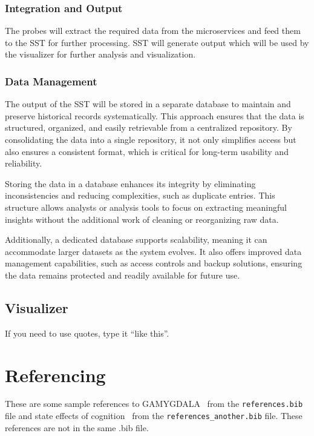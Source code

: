 \subsubsection{Integration and Output}

The probes will extract the required data from the microservices and feed them to the SST for further processing. SST will generate output which will be used by the visualizer for further analysis and visualization.

\subsubsection{Data Management}

The output of the SST will be stored in a separate database to maintain and preserve historical records systematically. This approach ensures that the data is structured, organized, and easily retrievable from a centralized repository. By consolidating the data into a single repository, it not only simplifies access but also ensures a consistent format, which is critical for long-term usability and reliability. 

Storing the data in a database enhances its integrity by eliminating inconsistencies and reducing complexities, such as duplicate entries. This structure allows analysts or analysis tools to focus on extracting meaningful insights without the additional work of cleaning or reorganizing raw data.

Additionally, a dedicated database supports scalability, meaning it can accommodate larger datasets as the system evolves. It also offers improved data management capabilities, such as access controls and backup solutions, ensuring the data remains protected and readily available for future use.

\subsection{Visualizer}\label{subsec:component-visualizer}

If you need to use quotes, type it ``like this''.

\section{Referencing}
These are some sample references to GAMYGDALA~\citep{popescu2014gamygdala} from 
the \texttt{references.bib} file and state effects of 
cognition~\citep{hudlicka2002time} from the \texttt{references\_another.bib} 
file. These references are not in the same .bib file.

